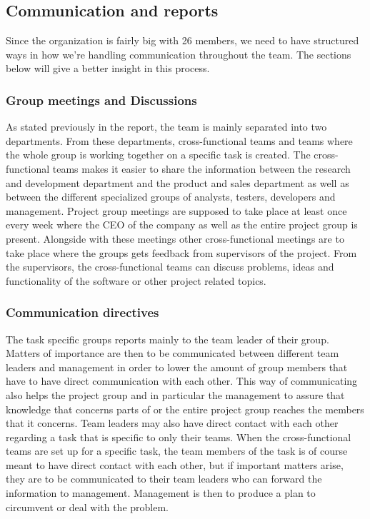 \subsection{Communication and reports}
Since the organization is fairly big with 26 members, we need to have structured ways in how we're handling communication throughout the team. The sections below will give a better insight in this process. 
\subsubsection{Group meetings and Discussions}
As stated previously in the report, the team is mainly separated into two departments. From these departments, cross-functional teams and teams where the whole group is working together on a specific task is created. The cross-functional teams makes it easier to share the information between the research and development department and the product and sales department as well as between the different specialized groups of analysts, testers, developers and management. Project group meetings are supposed to take place at least once every week where the CEO of the company as well as the entire project group is present. Alongside with these meetings other cross-functional meetings are to take place where the groups gets feedback from supervisors of the project. From the supervisors, the cross-functional teams can discuss problems, ideas and functionality of the software or other project related topics. 

\subsubsection{Communication directives}
The task specific groups reports mainly to the team leader of their group. Matters of importance are then to be communicated between different team leaders and management in order to lower the amount of group members that have to have direct communication with each other. This way of communicating also helps the project group and in particular the management to assure that knowledge that concerns parts of or the entire project group reaches the members that it concerns. Team leaders may also have direct contact with each other regarding a task that is specific to only their teams. When the cross-functional teams are set up for a specific task, the team members of the task is of course meant to have direct contact with each other, but if important matters arise, they are to be communicated to their team leaders who can forward the information to management. Management is then to produce a plan to circumvent or deal with the problem. 

